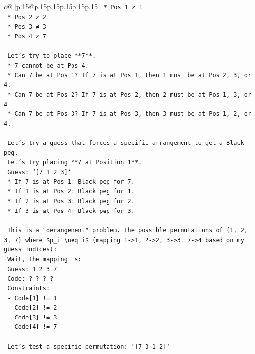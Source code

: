 \documentclass{article}
\begin{document}
{\begin{supertabular}{c@{$\;$}|p{.15\linewidth}@{}p{.15\linewidth}p{.15\linewidth}p{.15\linewidth}p{.15\linewidth}p{.15\linewidth}}
{{{\texttt{        *   Pos 1 ≠ 1} \\
\texttt{        *   Pos 2 ≠ 2} \\
\texttt{        *   Pos 3 ≠ 3} \\
\texttt{        *   Pos 4 ≠ 7} \\
\\ 
\texttt{    Let's try to place **7**.} \\
\texttt{    *   7 cannot be at Pos 4.} \\
\texttt{    *   Can 7 be at Pos 1? If 7 is at Pos 1, then 1 must be at Pos 2, 3, or 4.} \\
\texttt{    *   Can 7 be at Pos 2? If 7 is at Pos 2, then 2 must be at Pos 1, 3, or 4.} \\
\texttt{    *   Can 7 be at Pos 3? If 7 is at Pos 3, then 3 must be at Pos 1, 2, or 4.} \\
\\ 
\texttt{    Let's try a guess that forces a specific arrangement to get a Black peg.} \\
\texttt{    Let's try placing **7 at Position 1**.} \\
\texttt{    Guess: `{[}7 1 2 3{]}`} \\
\texttt{    *   If 7 is at Pos 1: Black peg for 7.} \\
\texttt{    *   If 1 is at Pos 2: Black peg for 1.} \\
\texttt{    *   If 2 is at Pos 3: Black peg for 2.} \\
\texttt{    *   If 3 is at Pos 4: Black peg for 3.} \\
\\ 
\texttt{    This is a "derangement" problem. The possible permutations of \{1, 2, 3, 7\} where \$p\_i \textbackslash{}neq i\$ (mapping 1{-}>1, 2{-}>2, 3{-}>3, 7{-}>4 based on my guess indices):} \\
\texttt{    Wait, the mapping is:} \\
\texttt{    Guess: 1 2 3 7} \\
\texttt{    Code: ? ? ? ?} \\
\texttt{    Constraints:} \\
\texttt{    {-} Code{[}1{]} != 1} \\
\texttt{    {-} Code{[}2{]} != 2} \\
\texttt{    {-} Code{[}3{]} != 3} \\
\texttt{    {-} Code{[}4{]} != 7} \\
\\ 
\texttt{    Let's test a specific permutation: `{[}7 3 1 2{]}`} \\
}}}
\end{supertabular}}
\end{document}
